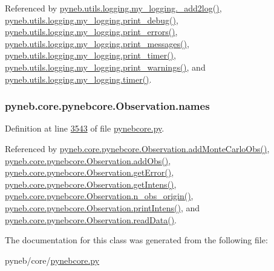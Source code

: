 Referenced by \hyperlink{logging_8py_source_l00059}{pyneb.\-utils.\-logging.\-my\-\_\-logging.\-\_\-add2log()}, \hyperlink{logging_8py_source_l00157}{pyneb.\-utils.\-logging.\-my\-\_\-logging.\-print\-\_\-debug()}, \hyperlink{logging_8py_source_l00149}{pyneb.\-utils.\-logging.\-my\-\_\-logging.\-print\-\_\-errors()}, \hyperlink{logging_8py_source_l00133}{pyneb.\-utils.\-logging.\-my\-\_\-logging.\-print\-\_\-messages()}, \hyperlink{logging_8py_source_l00165}{pyneb.\-utils.\-logging.\-my\-\_\-logging.\-print\-\_\-timer()}, \hyperlink{logging_8py_source_l00141}{pyneb.\-utils.\-logging.\-my\-\_\-logging.\-print\-\_\-warnings()}, and \hyperlink{logging_8py_source_l00115}{pyneb.\-utils.\-logging.\-my\-\_\-logging.\-timer()}.

\hypertarget{classpyneb_1_1core_1_1pynebcore_1_1_observation_a3f365d0b1488b2eba300bf71caf23c17}{
\subsubsection[{names}]{\setlength{\rightskip}{0pt plus 5cm}pyneb.\-core.\-pynebcore.\-Observation.\-names}}\label{classpyneb_1_1core_1_1pynebcore_1_1_observation_a3f365d0b1488b2eba300bf71caf23c17}


Definition at line \hyperlink{pynebcore_8py_source_l03543}{3543} of file \hyperlink{pynebcore_8py_source}{pynebcore.\-py}.



Referenced by \hyperlink{pynebcore_8py_source_l04069}{pyneb.\-core.\-pynebcore.\-Observation.\-add\-Monte\-Carlo\-Obs()}, \hyperlink{pynebcore_8py_source_l03589}{pyneb.\-core.\-pynebcore.\-Observation.\-add\-Obs()}, \hyperlink{pynebcore_8py_source_l03931}{pyneb.\-core.\-pynebcore.\-Observation.\-get\-Error()}, \hyperlink{pynebcore_8py_source_l03904}{pyneb.\-core.\-pynebcore.\-Observation.\-get\-Intens()}, \hyperlink{pynebcore_8py_source_l03658}{pyneb.\-core.\-pynebcore.\-Observation.\-n\-\_\-obs\-\_\-origin()}, \hyperlink{pynebcore_8py_source_l03958}{pyneb.\-core.\-pynebcore.\-Observation.\-print\-Intens()}, and \hyperlink{pynebcore_8py_source_l03711}{pyneb.\-core.\-pynebcore.\-Observation.\-read\-Data()}.



The documentation for this class was generated from the following file\-:\begin{DoxyCompactItemize}
\item 
pyneb/core/\hyperlink{pynebcore_8py}{pynebcore.\-py}\end{DoxyCompactItemize}
